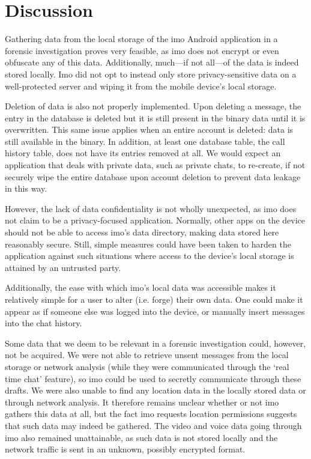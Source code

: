 \documentclass[conference]{IEEEtran}
\begin{document}
\section{Discussion}\label{sec:disc}

Gathering data from the local storage of the imo Android application in a
forensic investigation proves very feasible, as imo does not encrypt or even
obfuscate any of this data. Additionally, much---if not all---of the data is
indeed stored locally. Imo did not opt to instead only store privacy-sensitive
data on a well-protected server and wiping it from the mobile device's local
storage.

Deletion of data is also not properly implemented. Upon deleting a message, the
entry in the database is deleted but it is still present in the binary data
until it is overwritten. This same issue applies when an entire account is
deleted: data is still available in the binary. In addition, at least one
database table, the call history table, does not have its entries removed at
all. We would expect an application that deals with private data, such as
private chats, to re-create, if not securely wipe the entire database upon
account deletion to prevent data leakage in this way.

However, the lack of data confidentiality is not wholly unexpected, as imo does
not claim to be a privacy-focused application. Normally, other apps on the
device should not be able to access imo's data directory, making data stored
here reasonably secure. Still, simple measures could have been taken to harden
the application against such situations where access to the device's local
storage is attained by an untrusted party.

Additionally, the ease with which imo's local data was accessible makes it
relatively simple for a user to alter (i.e. forge) their own data. One could
make it appear as if someone else was logged into the device, or manually
insert messages into the chat history.

Some data that we deem to be relevant in a forensic investigation could,
however, not be acquired. We were not able to retrieve unsent messages from the
local storage or network analysis (while they were communicated through the
`real time chat' feature), so imo could be used to secretly communicate through
these drafts. We were also unable to find any location data in the locally
stored data or through network analysis. It therefore remains unclear whether
or not imo gathers this data at all, but the fact imo requests location
permissions suggests that such data may indeed be gathered. The video and voice
data going through imo also remained unattainable, as such data is not stored
locally and the network traffic is sent in an unknown, possibly encrypted
format.
\end{document}
